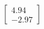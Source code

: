 \documentclass[preview]{standalone}
\begin{document}
\begin{align*}
\begin{bmatrix} 4.94 \\ -2.97 \end{bmatrix}
\end{align*}
\end{document}
